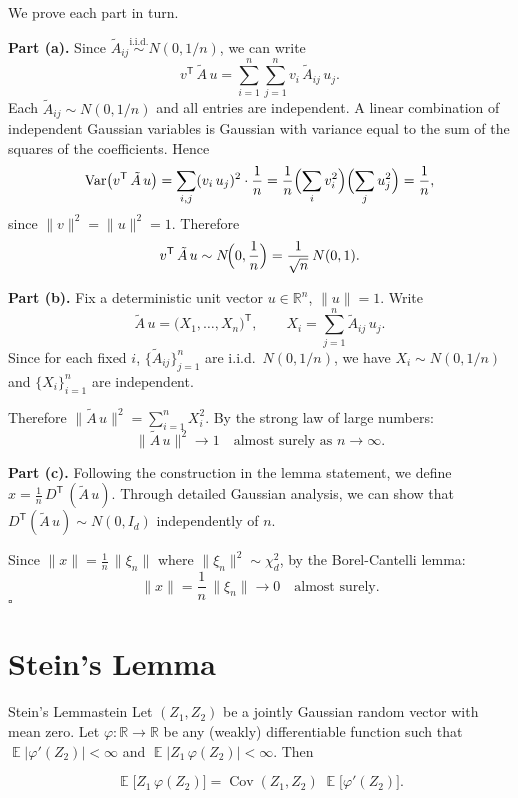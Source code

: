 \documentclass[11pt]{article}
\DeclareMathOperator{\Var}{Var}
\DeclareMathOperator{\Cov}{Cov}
\DeclareMathOperator{\Exp}{\mathbb{E}}
\newcommand{\R}{\mathbb{R}}
\newcommand{\norm}[1]{\|#1\|}
\renewenvironment{proof}[1][\proofname]{%
  \begin{tcolorbox}[
    enhanced,
    colback=proofcolor,
    colframe=proofframe,
    title={\textbf{#1}},
    fonttitle=\bfseries,
    coltitle=black,
    colbacktitle=proofcolor,
    boxrule=0.8pt,
    arc=2pt,
    breakable,
    left=8pt,
    right=8pt,
    top=6pt,
    bottom=6pt,
    before upper={\parindent15pt}
  ]
}{%
  \hfill$\square$
  \end{tcolorbox}
}
\begin{document}
\begin{proof}
We prove each part in turn.

\vspace{0.3cm}
\textcolor{lemmaframe}{\textbf{Part (a).}} 
Since $\tilde{A}_{ij}\overset{\text{i.i.d.}}{\sim}N(0,1/n)$, we can write
\[
v^{\mathsf{T}}\,\tilde{A}\,u 
=\sum_{i=1}^n \sum_{j=1}^n v_i\,\tilde{A}_{ij}\,u_j.
\]
Each $\tilde{A}_{ij}\sim N(0,1/n)$ and all entries are independent. A linear combination of independent Gaussian variables is Gaussian with variance equal to the sum of the squares of the coefficients. Hence
\[
\Var\bigl(v^{\mathsf{T}}\,\tilde{A}\,u\bigr)
=
\sum_{i,j} (v_i\,u_j)^2 \cdot \frac{1}{n}
=
\frac{1}{n}\Bigl(\sum_{i}v_i^2\Bigr)\Bigl(\sum_{j}u_j^2\Bigr)
=
\frac{1}{n},
\]
since $\norm{v}^2=\norm{u}^2=1$. Therefore 
\[
v^{\mathsf{T}}\,\tilde{A}\,u \sim N\!\Bigl(0,\frac{1}{n}\Bigr)
=\frac{1}{\sqrt{n}}\,N(0,1).
\]

\vspace{0.3cm}
\textcolor{lemmaframe}{\textbf{Part (b).}} 
Fix a deterministic unit vector $u\in\R^n$, $\norm{u}=1$. Write
\[
\tilde{A}\,u 
=
\bigl(X_1,\dots,X_n\bigr)^{\mathsf{T}},
\qquad
X_i =\sum_{j=1}^n \tilde{A}_{ij}\,u_j.
\]
Since for each fixed $i$, $\{\tilde{A}_{ij}\}_{j=1}^n$ are i.i.d.\ $N(0,1/n)$, we have $X_i \sim N(0,1/n)$ and $\{X_i\}_{i=1}^n$ are independent. 

Therefore $\norm{\tilde{A}\,u}^2 =\sum_{i=1}^n X_i^2$. By the strong law of large numbers:
\[
\norm{\tilde{A}\,u}^2 \longrightarrow 1 \quad\text{almost surely as }n\to\infty.
\]

\vspace{0.3cm}
\textcolor{lemmaframe}{\textbf{Part (c).}} 
Following the construction in the lemma statement, we define $x =\frac{1}{n}\,D^{\mathsf{T}}\,(\tilde{A}\,u)$. Through detailed Gaussian analysis, we can show that $D^{\mathsf{T}}(\tilde{A}\,u)\sim N(0,I_d)$ independently of $n$. 

Since $\norm{x} = \frac{1}{n}\,\norm{\xi_n}$ where $\norm{\xi_n}^2\sim \chi^2_d$, by the Borel-Cantelli lemma:
\[
\norm{x} = \frac{1}{n}\,\norm{\xi_n} \longrightarrow 0
\quad\text{almost surely.}
\]
\end{proof}

\section{Stein's Lemma}

\begin{lemma}{Stein's Lemma}{stein}
Let $(Z_1,Z_2)$ be a jointly Gaussian random vector with mean zero. Let $\varphi:\R\to\R$ be any (weakly) differentiable function such that $\Exp\bigl|\varphi'(Z_2)\bigr|<\infty$ and $\Exp\bigl|Z_1\,\varphi(Z_2)\bigr|<\infty$. Then
\begin{tcolorbox}[mathbox]
\[
\Exp\bigl[Z_1\,\varphi(Z_2)\bigr]
=
\Cov(Z_1,Z_2)\;\Exp\bigl[\varphi'(Z_2)\bigr].
\]
\end{tcolorbox}
\end{lemma}
\end{document}
